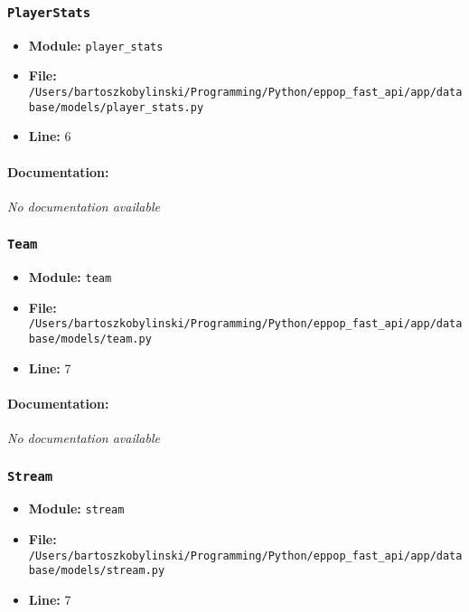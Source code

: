 \documentclass[11pt,a4paper]{article}
\begin{document}
\vspace{1em}
\subsubsection{\texttt{PlayerStats}}

\begin{itemize}
    \item \textbf{Module:} \texttt{player\_stats}
    \item \textbf{File:} \texttt{/Users/bartoszkobylinski/Programming/Python/eppop\_fast\_api/app/database/models/player\_stats.py}
    \item \textbf{Line:} 6
\end{itemize}

\paragraph{Documentation:} \textit{No documentation available}


\vspace{1em}
\subsubsection{\texttt{Team}}

\begin{itemize}
    \item \textbf{Module:} \texttt{team}
    \item \textbf{File:} \texttt{/Users/bartoszkobylinski/Programming/Python/eppop\_fast\_api/app/database/models/team.py}
    \item \textbf{Line:} 7
\end{itemize}

\paragraph{Documentation:} \textit{No documentation available}


\vspace{1em}
\subsubsection{\texttt{Stream}}

\begin{itemize}
    \item \textbf{Module:} \texttt{stream}
    \item \textbf{File:} \texttt{/Users/bartoszkobylinski/Programming/Python/eppop\_fast\_api/app/database/models/stream.py}
    \item \textbf{Line:} 7
\end{itemize}
\end{document}
